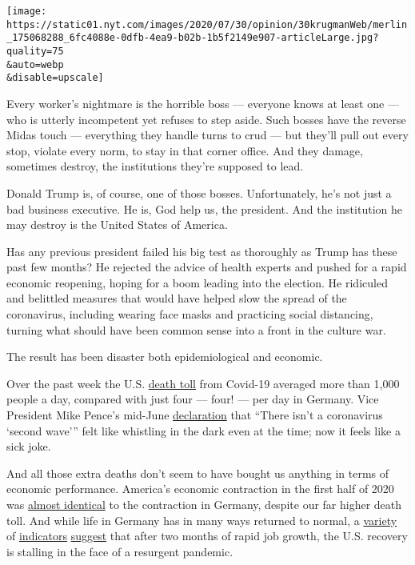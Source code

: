 \texttt{[image: https://static01.nyt.com/images/2020/07/30/opinion/30krugmanWeb/merlin\_175068288\_6fc4088e-0dfb-4ea9-b02b-1b5f2149e907-articleLarge.jpg?quality=75\\\&auto=webp\\\&disable=upscale]}

Every worker's nightmare is the horrible boss --- everyone knows at
least one --- who is utterly incompetent yet refuses to step aside. Such
bosses have the reverse Midas touch --- everything they handle turns to
crud --- but they'll pull out every stop, violate every norm, to stay in
that corner office. And they damage, sometimes destroy, the institutions
they're supposed to lead.

Donald Trump is, of course, one of those bosses. Unfortunately, he's not
just a bad business executive. He is, God help us, the president. And
the institution he may destroy is the United States of America.

Has any previous president failed his big test as thoroughly as Trump
has these past few months? He rejected the advice of health experts and
pushed for a rapid economic reopening, hoping for a boom leading into
the election. He ridiculed and belittled measures that would have helped
slow the spread of the coronavirus, including wearing face masks and
practicing social distancing, turning what should have been common sense
into a front in the culture war.

The result has been disaster both epidemiological and economic.

Over the past week the U.S.
\href{https://ourworldindata.org/coronavirus-data-explorer?zoomToSelection=true\&deathsMetric=true\&interval=smoothed\&smoothing=7\&country=USA~DEU\&pickerMetric=location\&pickerSort=asc}{death
toll} from Covid-19 averaged more than 1,000 people a day, compared with
just four --- four! --- per day in Germany. Vice President Mike Pence's
mid-June
\href{https://www.wsj.com/articles/there-isnt-a-coronavirus-second-wave-11592327890}{declaration}
that ``There isn't a coronavirus `second wave''' felt like whistling in
the dark even at the time; now it feels like a sick joke.

And all those extra deaths don't seem to have bought us anything in
terms of economic performance. America's economic contraction in the
first half of 2020 was
\href{https://www.wsj.com/articles/germanys-economy-suffers-biggest-contraction-on-record-but-green-shoots-emerge-11596101866}{almost
identical} to the contraction in Germany, despite our far higher death
toll. And while life in Germany has in many ways returned to normal, a
\href{https://twitter.com/ernietedeschi/status/1286740199796596743}{variety}
of
\href{https://twitter.com/ernietedeschi/status/1286741059435995136}{indicators}
\href{https://twitter.com/dandolfa/status/1287907164955303936}{suggest}
that after two months of rapid job growth, the U.S. recovery is stalling
in the face of a resurgent pandemic.

